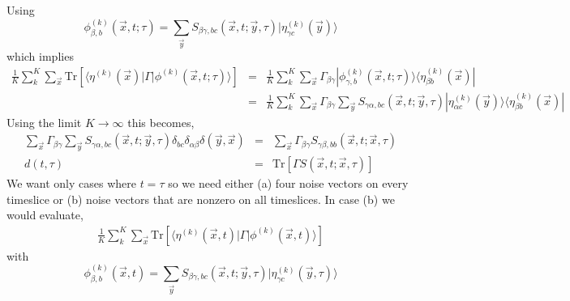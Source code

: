 \documentclass[3p,preprint]{elsarticle}
\begin{document}
Using
\begin{equation}
\phi^{(k)}_{\beta, b}(\vec{x}, t; \tau) = \sum_{\vec{y}} S_{\beta\gamma,b c} (\vec{x}, t; \vec{y}, \tau) | \eta^{(k)}_{\gamma c }(\vec{y})\rangle
\end{equation}
which implies
\begin{eqnarray}
\frac{1}{K} \sum_{k}^K \sum_{\vec{x}} \text{Tr} \left[ \langle \eta^{(k)}(\vec{x}) | \Gamma | \phi^{(k)} (\vec{x}, t; \tau) \rangle \right] &=& \frac{1}{K} \sum_{k}^K \sum_{\vec{x}} \Gamma_{\beta \gamma} | \phi^{(k)}_{\gamma, b}(\vec{x}, t; \tau) \rangle \langle \eta^{(k)}_{\beta b }(\vec{x}) | \\
 &=& \frac{1}{K} \sum_{k}^K \sum_{\vec{x}} \Gamma_{\beta \gamma} \sum_{\vec{y}} S_{\gamma \alpha,b c} (\vec{x}, t; \vec{y}, \tau)
| \eta^{(k)}_{\alpha c }(\vec{y})\rangle \langle \eta^{(k)}_{\beta b }(\vec{x}) |
\end{eqnarray}
Using the limit $K \rightarrow \infty$ this becomes,
\begin{eqnarray}
\sum_{\vec{x}} \Gamma_{\beta \gamma} \sum_{\vec{y}} S_{\gamma \alpha,b c} (\vec{x}, t; \vec{y}, \tau)
\delta_{bc} \delta_{\alpha \beta} \delta(\vec{y}, \vec{x}) &=&
\sum_{\vec{x}} \Gamma_{\beta \gamma} S_{\gamma \beta,b b} (\vec{x}, t; \vec{x}, \tau) \\
d(t, \tau) &=& \text{Tr} \left[ \Gamma S(\vec{x}, t; \vec{x}, \tau) \right]
\end{eqnarray}
We want only cases where $t = \tau$ so we need either (a) four noise vectors on every timeslice or
(b) noise vectors that are nonzero on all timeslices. In case (b) we would evaluate,
\begin{eqnarray}
\frac{1}{K} \sum_{k}^K \sum_{\vec{x}} \text{Tr} \left[ \langle \eta^{(k)}(\vec{x}, t) | \Gamma | \phi^{(k)} (\vec{x}, t) \rangle \right]
\end{eqnarray}
with
\begin{equation}
\phi^{(k)}_{\beta, b}(\vec{x}, t) = \sum_{\vec{y}} S_{\beta\gamma,b c} (\vec{x}, t; \vec{y}, \tau) | \eta^{(k)}_{\gamma c }(\vec{y}, \tau)\rangle
\end{equation}
\end{document}

